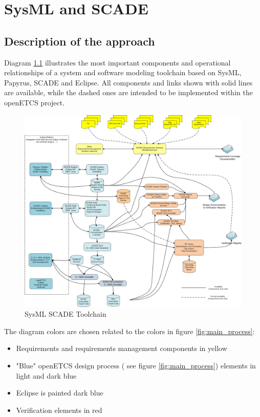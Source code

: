 \chapter{SysML and SCADE}
\label{sec:sysML-Scade}

\section{Description of the approach}

Diagram \ref{fig:SysML_SCADE_Toolchain} illustrates the most important components and operational relationships of a system and software modeling toolchain based on SysML, Papyrus, SCADE and Eclipse. 
All components and links shown with solid lines are available, while the dashed ones are intended to be implemented within the openETCS project. 


\begin{figure}[htbp]
	\centering
		\includegraphics[width=1.10\textwidth]{images/SysML_SCADE_Toolchain.png}
	\caption{SysML SCADE Toolchain}
	\label{fig:SysML_SCADE_Toolchain}
\end{figure}


The diagram colors are chosen related to the colors in figure \ref{fig:main_process}: 

\begin{itemize}
	\item Requirements and requirements management components in yellow
	\item "Blue" openETCS design process ( see figure \ref{fig:main_process}) elements in light and dark blue
	\item Eclipse is painted dark blue
	\item Verification elements in red
\end{itemize}


